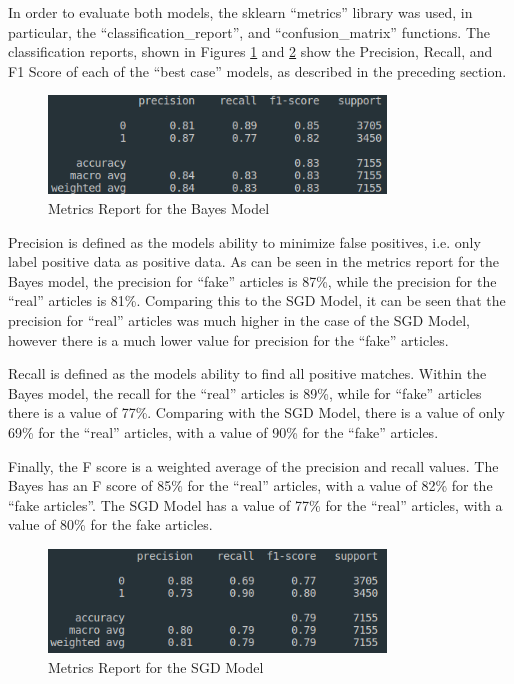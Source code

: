 In order to evaluate both models, the sklearn ``metrics'' library was used, in
particular, the ``classification\_report'', and ``confusion\_matrix'' functions.
The classification reports, shown in Figures \ref{fig:bayesReport} and
\ref{fig:sgdReport} show the Precision, Recall, and F1 Score of each of the
``best case'' models, as described in the preceding section.

\begin{figure}[H]
	\centering
	\includegraphics[width=0.8\textwidth]{images/bayesMetricReport}
	\caption{Metrics Report for the Bayes Model}
	\label{fig:bayesReport}
\end{figure}

Precision is defined as the models ability to minimize false positives, i.e.
only label positive data as positive data\cite{skMetric}. As can be seen in the
metrics report for the Bayes model, the precision for ``fake'' articles is
87\%, while the precision for the ``real'' articles is 81\%. Comparing this to
the SGD Model, it can be seen that the precision for ``real'' articles was much
higher in the case of the SGD Model, however there is a much lower value for
precision for the ``fake'' articles.

Recall is defined as the models ability to find all positive
matches\cite{skMetric}. Within the Bayes model, the recall for the ``real''
articles is 89\%, while for ``fake'' articles there is a value of 77\%.
Comparing with the SGD Model, there is a value of only 69\% for the ``real''
articles, with a value of 90\%  for the ``fake'' articles.

Finally, the F score is a weighted average of the precision and recall values.
The Bayes has an F score of 85\% for the ``real'' articles, with a value of 82\%
for the ``fake articles''. The SGD Model has a value of 77\% for the ``real''
articles, with a value of 80\% for the fake articles.

\begin{figure}[H]
	\centering
	\includegraphics[width=0.8\textwidth]{images/sgdMetricReport}
	\caption{Metrics Report for the SGD Model}
	\label{fig:sgdReport}
\end{figure}

